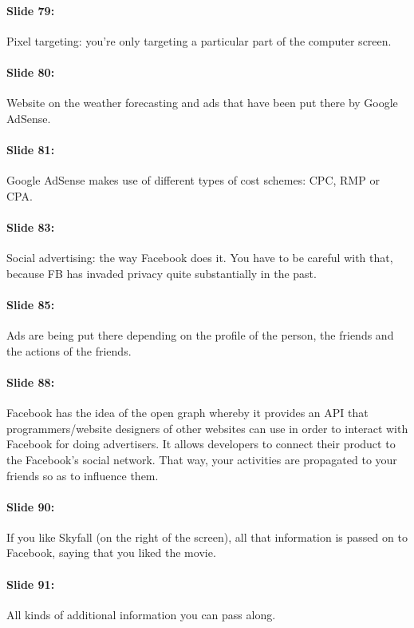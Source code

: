\documentclass[10pt,a4paper]{report}
\begin{document}
\paragraph{Slide 79:}Pixel targeting: you're only targeting a particular part of the computer screen.

\paragraph{Slide 80:}Website on the weather forecasting and ads that have been put there by Google AdSense.

\paragraph{Slide 81:}Google AdSense makes use of different types of cost schemes: CPC, RMP or CPA.

\paragraph{Slide 83:}Social advertising: the way Facebook does it. You have to be careful with that, because FB has invaded privacy quite substantially in the past. 

\paragraph{Slide 85:}Ads are being put there depending on the profile of the person, the friends and the actions of the friends.

\paragraph{Slide 88:}Facebook has the idea of the open graph whereby it provides an API that programmers/website designers of other websites can use in order to interact with Facebook for doing advertisers. It allows developers to connect their product to the Facebook's social network. That way, your activities are propagated to your friends so as to influence them.

\paragraph{Slide 90:}If you like Skyfall (on the right of the screen), all that information is passed on to Facebook, saying that you liked the movie.

\paragraph{Slide 91:}All kinds of additional information you can pass along.
\end{document}
